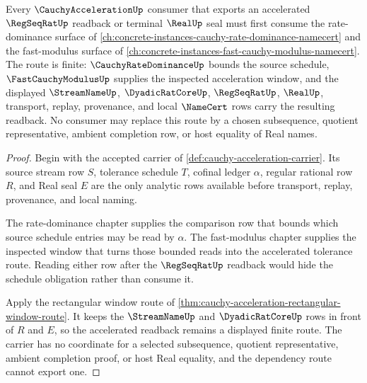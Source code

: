 \begin{theorem}
\label{thm:cauchy-acceleration-cauchy-subsequence-route}
Every $\CauchyAccelerationUp$ consumer that exports an accelerated $\RegSeqRatUp$ readback or terminal $\RealUp$ seal must first consume the rate-dominance surface of \autoref{ch:concrete-instances-cauchy-rate-dominance-namecert} and the fast-modulus surface of \autoref{ch:concrete-instances-fast-cauchy-modulus-namecert}. The route is finite: $\CauchyRateDominanceUp$ bounds the source schedule, $\FastCauchyModulusUp$ supplies the inspected acceleration window, and the displayed $\StreamNameUp$, $\DyadicRatCoreUp$, $\RegSeqRatUp$, $\RealUp$, transport, replay, provenance, and local $\NameCert$ rows carry the resulting readback. No consumer may replace this route by a chosen subsequence, quotient representative, ambient completion row, or host equality of Real names.
\end{theorem}
\begin{proof}
Begin with the accepted carrier of \autoref{def:cauchy-acceleration-carrier}. Its source stream row $S$, tolerance schedule $T$, cofinal ledger $\alpha$, regular rational row $R$, and Real seal $E$ are the only analytic rows available before transport, replay, provenance, and local naming.

The rate-dominance chapter supplies the comparison row that bounds which source schedule entries may be read by $\alpha$. The fast-modulus chapter supplies the inspected window that turns those bounded reads into the accelerated tolerance route. Reading either row after the $\RegSeqRatUp$ readback would hide the schedule obligation rather than consume it.

Apply the rectangular window route of \autoref{thm:cauchy-acceleration-rectangular-window-route}. It keeps the $\StreamNameUp$ and $\DyadicRatCoreUp$ rows in front of $R$ and $E$, so the accelerated readback remains a displayed finite route. The carrier has no coordinate for a selected subsequence, quotient representative, ambient completion proof, or host Real equality, and the dependency route cannot export one.
\end{proof}
